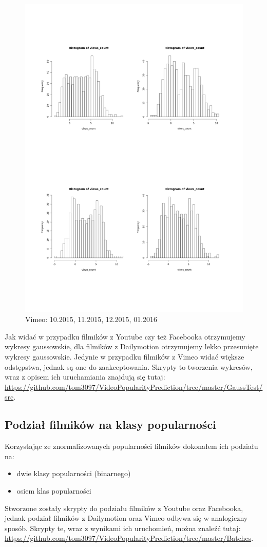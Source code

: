 \documentclass{article}
\begin{document}
\begin{figure}[H]
\caption{Vimeo: 10.2015, 11.2015, 12.2015, 01.2016}
\centering
\includegraphics[scale=0.7]{vimeoGauss}
\end{figure}
Jak widać w przypadku filmików z Youtube czy też Facebooka otrzymujemy wykresy gaussowskie, dla filmików z Dailymotion otrzymujemy lekko przesunięte wykresy gaussowskie. Jedynie w przypadku filmików z Vimeo widać większe odstępstwa, jednak są one do zaakceptowania.
Skrypty to tworzenia wykresów, wraz z opisem ich uruchamiania znajdują się tutaj: \url{https://github.com/tom3097/VideoPopularityPrediction/tree/master/GaussTest/src}.

\subsection{Podział filmików na klasy popularności}
Korzystając ze znormalizowanych popularności filmików dokonałem ich podziału na:
\begin{itemize}
    \item dwie klasy popularności (binarnego)
    \item osiem klas popularności
\end{itemize}
Stworzone zostały skrypty do podziału filmików z Youtube oraz Facebooka, jednak podział filmików z Dailymotion oraz Vimeo odbywa się w analogiczny sposób. Skrypty te, wraz z wynikami ich uruchomień, można znaleźć tutaj: \url{https://github.com/tom3097/VideoPopularityPrediction/tree/master/Batches}.
\end{document}
